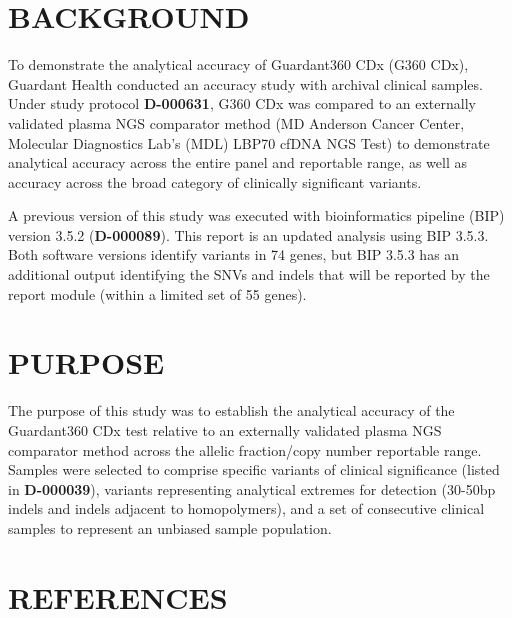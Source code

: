 \documentclass[12pt]{protocol}
\begin{document}
{}

\section{BACKGROUND}

To demonstrate the analytical accuracy of Guardant360 CDx (G360 CDx), Guardant Health conducted an
accuracy study with archival clinical samples. Under study protocol \textbf{D-000631}, G360 CDx was
compared to an externally validated plasma NGS comparator method (MD Anderson Cancer Center,
Molecular Diagnostics Lab’s (MDL) LBP70 cfDNA NGS Test) to demonstrate analytical accuracy across
the entire panel and reportable range, as well as accuracy across the broad category of clinically
significant variants.

A previous version of this study was executed with bioinformatics pipeline (BIP) version 3.5.2
(\textbf{D-000089}). This report is an updated analysis using BIP 3.5.3. Both software versions identify
variants in 74 genes, but BIP 3.5.3 has an additional output identifying the SNVs and indels that
will be reported by the report module (within a limited set of 55 genes).

\section{PURPOSE}

The purpose of this study was to establish the analytical accuracy of the Guardant360 CDx test
relative to an externally validated plasma NGS comparator method across the allelic fraction/copy
number reportable range. Samples were selected to comprise specific variants of clinical
significance (listed in \textbf{D-000039}), variants representing analytical extremes for detection
(30-50bp indels and indels adjacent to homopolymers), and a set of consecutive clinical samples to
represent an unbiased sample population.

\section{REFERENCES}
\end{document}
